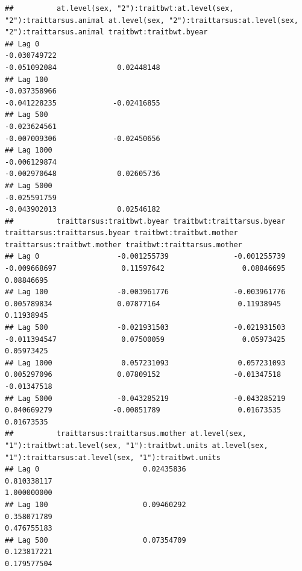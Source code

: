\documentclass[
  12pt,
]{book}
\begin{document}
\begin{verbatim}
##          at.level(sex, "2"):traitbwt:at.level(sex, "2"):traittarsus.animal at.level(sex, "2"):traittarsus:at.level(sex, "2"):traittarsus.animal traitbwt:traitbwt.byear
## Lag 0                                                         -0.030749722                                                         -0.051092084              0.02448148
## Lag 100                                                       -0.037358966                                                         -0.041228235             -0.02416855
## Lag 500                                                       -0.023624561                                                         -0.007009306             -0.02450656
## Lag 1000                                                      -0.006129874                                                         -0.002970648              0.02605736
## Lag 5000                                                      -0.025591759                                                         -0.043902013              0.02546182
##          traittarsus:traitbwt.byear traitbwt:traittarsus.byear traittarsus:traittarsus.byear traitbwt:traitbwt.mother traittarsus:traitbwt.mother traitbwt:traittarsus.mother
## Lag 0                  -0.001255739               -0.001255739                  -0.009668697               0.11597642                  0.08846695                  0.08846695
## Lag 100                -0.003961776               -0.003961776                   0.005789834               0.07877164                  0.11938945                  0.11938945
## Lag 500                -0.021931503               -0.021931503                  -0.011394547               0.07500059                  0.05973425                  0.05973425
## Lag 1000                0.057231093                0.057231093                   0.005297096               0.07809152                 -0.01347518                 -0.01347518
## Lag 5000               -0.043285219               -0.043285219                   0.040669279              -0.00851789                  0.01673535                  0.01673535
##          traittarsus:traittarsus.mother at.level(sex, "1"):traitbwt:at.level(sex, "1"):traitbwt.units at.level(sex, "1"):traittarsus:at.level(sex, "1"):traitbwt.units
## Lag 0                        0.02435836                                                   0.810338117                                                      1.000000000
## Lag 100                      0.09460292                                                   0.358071789                                                      0.476755183
## Lag 500                      0.07354709                                                   0.123817221                                                      0.179577504

\end{verbatim}
\end{document}
